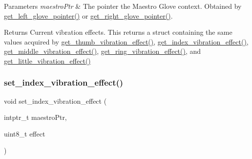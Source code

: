 \begin{DoxyParams}{Parameters}
{\em maestro\+Ptr} & The pointer the Maestro Glove context. Obtained by \hyperlink{group__glove_management_ga63ce3c99d4a8b8db851b22af9185764e}{get\+\_\+left\+\_\+glove\+\_\+pointer()} or \hyperlink{group__glove_management_ga9b8fd9d91aeac3f8da50f7a7eba0c32b}{get\+\_\+right\+\_\+glove\+\_\+pointer()}. \\
\hline
\end{DoxyParams}
\begin{DoxyReturn}{Returns}
Current vibration effects. This returns a struct containing the same values acquired by {\ttfamily \hyperlink{group__vibration_control_ga113a34ad762dbc4a4b033f81b0b11a65}{get\+\_\+thumb\+\_\+vibration\+\_\+effect()}}, {\ttfamily \hyperlink{group__vibration_control_ga4902e5e4253a07ab5b123a714f2bff0c}{get\+\_\+index\+\_\+vibration\+\_\+effect()}}, {\ttfamily \hyperlink{group__vibration_control_ga3d474e4b3c72158eff250da56a814472}{get\+\_\+middle\+\_\+vibration\+\_\+effect()}}, {\ttfamily \hyperlink{group__vibration_control_gab5ed06d83c3322a2b98d1ecc9ccbd210}{get\+\_\+ring\+\_\+vibration\+\_\+effect()}}, and {\ttfamily \hyperlink{group__vibration_control_gab0516e0a1963f208e192e24f64dde42e}{get\+\_\+little\+\_\+vibration\+\_\+effect()}} 
\end{DoxyReturn}
\mbox{\label{group__vibration_control_ga1574bdd826660ba522e6a9e527b912d5}} 
\subsubsection{\texorpdfstring{set\+\_\+index\+\_\+vibration\+\_\+effect()}{set\_index\_vibration\_effect()}}
{\footnotesize\ttfamily void set\+\_\+index\+\_\+vibration\+\_\+effect (\begin{DoxyParamCaption}\item[{intptr\+\_\+t}]{maestro\+Ptr,  }\item[{uint8\+\_\+t}]{effect }\end{DoxyParamCaption})}

